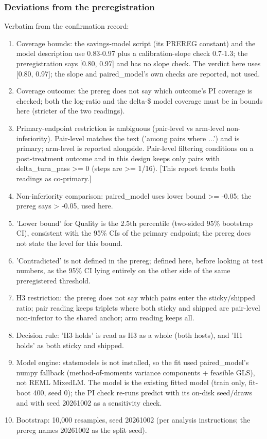 \documentclass[11pt,letterpaper]{article}
\begin{document}
\subsubsection*{Deviations from the preregistration}\label{vt:sec:deviations}
Verbatim from the confirmation record:
{\small%
\begin{enumerate}[leftmargin=1.4em]
\item Coverage bounds: the savings-model script (its PREREG constant) and the model description use 0.83-0.97 plus a calibration-slope check 0.7-1.3; the preregistration says [0.80, 0.97] and has no slope check. The verdict here uses [0.80, 0.97]; the slope and paired\_model's own checks are reported, not used.
\item Coverage outcome: the prereg does not say which outcome's PI coverage is checked; both the log-ratio and the delta-\$ model coverage must be in bounds here (stricter of the two readings).
\item Primary-endpoint restriction is ambiguous (pair-level vs arm-level non-inferiority). Pair-level matches the text ('among pairs where ...') and is primary; arm-level is reported alongside. Pair-level filtering conditions on a post-treatment outcome and in this design keeps only pairs with delta\_turn\_pass >= 0 (steps are >= 1/16). [This report treats both readings as co-primary.]
\item Non-inferiority comparison: paired\_model uses lower bound >= -0.05; the prereg says > -0.05, used here.
\item 'Lower bound' for Quality is the 2.5th percentile (two-sided 95\% bootstrap CI), consistent with the 95\% CIs of the primary endpoint; the prereg does not state the level for this bound.
\item 'Contradicted' is not defined in the prereg; defined here, before looking at test numbers, as the 95\% CI lying entirely on the other side of the same preregistered threshold.
\item H3 restriction: the prereg does not say which pairs enter the sticky/shipped ratio; pair reading keeps triplets where both sticky and shipped are pair-level non-inferior to the shared anchor; arm reading keeps all.
\item Decision rule: 'H3 holds' is read as H3 as a whole (both hosts), and 'H1 holds' as both sticky and shipped.
\item Model engine: statsmodels is not installed, so the fit used paired\_model's numpy fallback (method-of-moments variance components + feasible GLS), not REML MixedLM. The model is the existing fitted model (train only, fit-boot 400, seed 0); the PI check re-runs predict with its on-disk seed/draws and with seed 20261002 as a sensitivity check.
\item Bootstrap: 10,000 resamples, seed 20261002 (per analysis instructions; the prereg names 20261002 as the split seed).
\end{enumerate}
}
\end{document}
